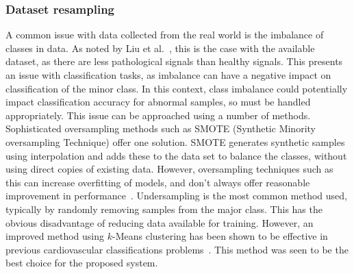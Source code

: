 \documentclass[titlepage, 12pt]{scrartcl} \usepackage{enumitem}
\begin{document}
\subsubsection{Dataset resampling}\label{Resample}
A common issue with data collected from the real world is the imbalance of
classes in data. As noted by Liu et al.~\parencite{Liu2016}, this is the case
with the available dataset, as there are less pathological signals than healthy
signals.  This presents an issue with classification tasks, as imbalance can
have a negative impact on classification of the minor class. In this context,
class imbalance could potentially impact classification accuracy for abnormal
samples, so must be handled appropriately. This issue can be approached using a
number of methods. Sophisticated oversampling methods such as SMOTE (Synthetic
Minority oversampling Technique) offer one solution. SMOTE generates synthetic
samples using interpolation and adds these to the data set to balance the
classes, without using direct copies of existing data. However, oversampling
techniques such as this can increase overfitting of models, and don't always
offer reasonable improvement in performance~\parencite{Longadge2013}.
Undersampling is the most common method used, typically by randomly removing
samples from the major class. This has the obvious disadvantage of reducing
data available for training. However, an improved method using $k$-Means
clustering has been shown to be effective in previous cardiovascular
classifications problems~\parencite{Rahman2013}. This method was seen to be the
best choice for the proposed system.
\end{document}
